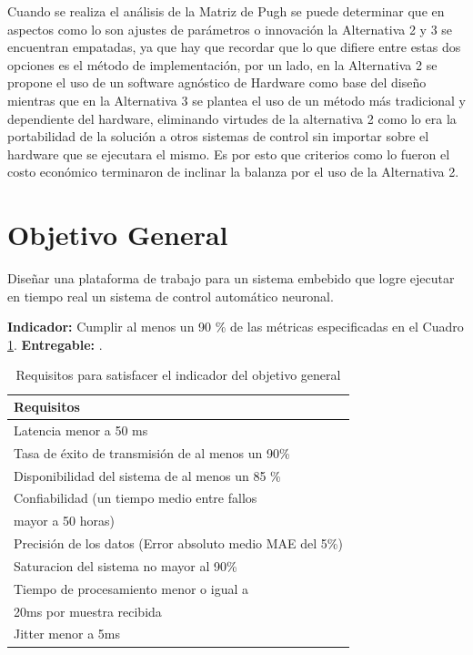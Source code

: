 \documentclass[12pt]{article}
\begin{document}
Cuando se realiza el análisis de la Matriz de Pugh se puede determinar que en aspectos como lo son ajustes de parámetros o innovación la Alternativa 2 y 3 se encuentran empatadas, ya que hay que recordar que lo que difiere entre estas dos opciones es el método de implementación, por un lado, en la Alternativa 2 se propone el uso de un software agnóstico de Hardware como base del diseño mientras que en la Alternativa 3 se plantea el uso de un método más tradicional y dependiente del hardware, eliminando virtudes de la alternativa 2 como lo era la portabilidad de la solución a otros sistemas de control sin importar sobre el hardware que se ejecutara el mismo. Es por esto que criterios como lo fueron el costo económico terminaron de inclinar la balanza por el uso de la Alternativa 2.

\section{Objetivo General}

Diseñar una plataforma de trabajo para un sistema embebido que logre ejecutar en tiempo real un sistema de control automático neuronal.

\textbf{Indicador:} Cumplir al menos un 90 \% de las métricas especificadas en el Cuadro \ref{tab:obj_1}.\newline
\textbf{Entregable:} .


\begin{table}[!h]
  \centering
  \caption{Requisitos para satisfacer el indicador del objetivo general}
  \label{tab:obj_1}
  \begin{tabular}{|l|}
    \hline
    \rowcolor[HTML]{DAE8FC} 
    Requisitos \\ \hline
    Latencia menor a 50 ms\\ \hline
    Tasa de éxito de transmisión de al menos un 90\%\\ \hline
    Disponibilidad del sistema de al menos un 85 \% \\ \hline
    Confiabilidad (un tiempo medio entre fallos \\ mayor a 50 horas) \\ \hline
    Precisión de los datos (Error absoluto medio MAE del 5\%)\\ \hline
    Saturacion del sistema no mayor al 90\% \\ \hline
    Tiempo de procesamiento menor o igual a \\ 20ms por muestra recibida\\ \hline
    Jitter menor a 5ms \\ \hline
    \end{tabular}
\end{table}
\end{document}
